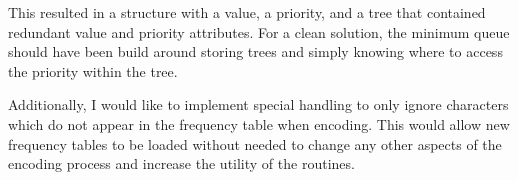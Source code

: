 \documentclass[a4paper,12pt]{article}
\begin{document}
This resulted in a structure with a value, a priority, and a tree that contained redundant value and priority attributes.  For a clean solution, the minimum queue should have been build around storing trees and simply knowing where to access the priority within the tree.

Additionally, I would like to implement special handling to only ignore characters which do not appear in the frequency table when encoding. This would allow new frequency tables to be loaded without needed to change any other aspects of the encoding process and increase the utility of the routines.

\end{document}
